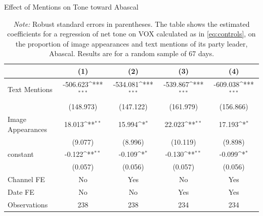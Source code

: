\documentclass[12pt]{article}
\begin{document}
	
	\begin{table}[!htb]\centering
		\def\sym#1{\ifmmode^{#1}\else\(^{#1}\)\fi}
		\caption{Effect of Mentions on Tone toward Abascal}
		\begin{tabular}{l*{4}{c}}
			\hline\hline
			&\multicolumn{1}{c}{(1)}         &\multicolumn{1}{c}{(2)}         &\multicolumn{1}{c}{(3)}         &\multicolumn{1}{c}{(4)}         \\
			\hline
			Text Mentions   & -506.623\sym{***}& -534.081\sym{***}& -539.867\sym{***}& -609.038\sym{***}\\
			&(148.973)         &(147.122)         &(161.979)         &(156.866)         \\
			Image Appearances  &   18.013\sym{**} &   15.994\sym{*}  &   22.023\sym{**} &   17.193\sym{*}  \\
			&  (9.077)         &  (8.996)         & (10.119)         &  (9.898)         \\
			constant          &   -0.122\sym{**} &   -0.109\sym{*}  &   -0.130\sym{**} &   -0.099\sym{*}  \\
			&  (0.057)         &  (0.056)         &  (0.057)         &  (0.056)         \\
			Channel FE      &       No         &      Yes         &       No         &      Yes         \\
			Date FE         &       No         &       No         &      Yes         &      Yes         \\
			\hline
			Observations    &      238         &      238         &      234         &      234         \\
			\hline\hline
		\end{tabular}
		\label{tab:abascal_images}
		\vspace{0.5em}
		\caption*{\scriptsize\emph{Note:} Robust standard errors in parentheses. The table shows the estimated coefficients for a regression of net tone on VOX calculated as in \ref{eq:controls}, on the proportion of image appearances and text mentions of its party leader, Abascal. Results are for a random sample of 67 days. }
	\end{table}
	
\end{document}
